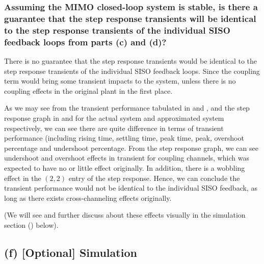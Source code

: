 \documentclass{tron}
\begin{document}
\subsubsection{Assuming the MIMO closed-loop system is stable, is there a guarantee that the step response transients will be identical to the step response transients of the individual SISO feedback loops from parts (c) and (d)?}
There is no guarantee that the step response transients would be identical to the step response transients of the individual SISO feedback loops. Since the coupling term would bring some transient impacts to the system, unless there is no coupling effects in the original plant in the first place. 

As we may see from the transient performance tabulated in  and , and the step response graph in  and  for the actual system and approximated system respectively, we can see there are quite difference in terms of transient performance (including rising time, settling time, peak time, peak, overshoot percentage and undershoot percentage. From the step response graph, we can see undershoot and overshoot effects in transient for coupling channels, which was expected to have no or little effect originally. In addition, there is a wobbling effect in the $(2,2)$ entry of the step response. Hence, we can conclude the transient performance would not be identical to the individual SISO feedback, as long as there exists cross-channeling effects originally. 

(We will see and further discuss about these effects visually in the simulation section () below).

\clearpage
\subsection{(f) [Optional] Simulation \label{ans:P5-f}}
\end{document}
